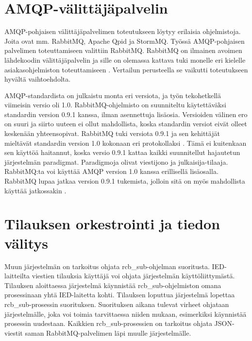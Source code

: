 

\section{AMQP-välittäjäpalvelin}
AMQP-pohjaisen välittäjäpalvelimen toteutukseen löytyy erilaisia ohjelmistoja. Joita ovat mm. RabbitMQ, Apache Qpid ja StormMQ. Työssä AMQP-pohjaisen palvelimen toteuttamiseen valittiin RabbitMQ. RabbitMQ on ilmainen avoimen lähdekoodin välittäjäpalvelin ja sille on olemassa kattava tuki monelle eri kielelle asiakasohjelmiston toteuttamiseen \cite{rabbitmq-supported-languages}. Vertailun perusteella se vaikutti toteutukseen hyvältä vaihtoehdolta.

AMQP-standardista on julkaistu monta eri versiota, ja työn tekohetkellä viimeisin versio oli 1.0. RabbitMQ-ohjelmisto on suunniteltu käytettäväksi standardin version 0.9.1 kanssa, ilman asennettuja lisäosia. Versioiden välinen ero on suuri ja siirto uuteen ei ollut mahdollista, koska standardin versiot eivät olleet keskenään yhteensopivat. RabbitMQ tuki versiota 0.9.1 ja sen kehittäjät mieltävät standardin version 1.0 kokonaan eri protokollaksi \cite{RabbitMQ-Compatibility-and-Conformance}. Tämä ei kuitenkaan sen käyttöä haitannut, koska versio 0.9.1 kattaa kaikki suunnitellut hajautetun järjestelmän paradigmat. Paradigmoja olivat viestijono ja julkaisija-tilaaja. RabbitMQ:ta voi käyttää AMQP version 1.0 kanssa erillisellä lisäosalla. RabbitMQ lupaa jatkaa version 0.9.1 tukemista, jolloin sitä on myös mahdollista käyttää jatkossakin \cite{RabbitMQ-Compatibility-and-Conformance}.


\section{Tilauksen orkestrointi ja tiedon välitys}
Muun järjestelmän on tarkoitus ohjata rcb\_sub-ohjelman suoritusta. IED-laitteilta viestien tilauksia käyttäjä voi ohjata järjestelmän käyttöliittymästä. Tilauksen aloittaessa järjestelmä käynnistää rcb\_sub-ohjelmiston omana prosessinaan yhtä IED-laitetta kohti. Tilauksen loputtua järjestelmä lopettaa rcb\_sub-prosessin suorituksen. Suorituksen aikana tulevat virheet ohjataan järjestelmälle, joka voi toimia tarvittaessa niiden mukaan, esimerkiksi käynnistää prosessin uudestaan. Kaikkien rcb\_sub-prosessien on tarkoitus ohjata JSON-viestit saman RabbitMQ-palvelimen läpi muulle järjestelmälle.

